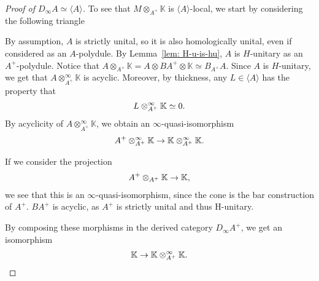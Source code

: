 \documentclass[../thesis.tex]{subfiles}
\begin{document}
\begin{proof}[Proof of $D_\infty A \simeq \langle A \rangle$]
                To see that $M \otimes_{A^+} \mathbb{K}$ is $\langle A \rangle$-local, we start by considering the following triangle
                \begin{center}
                \end{center}
                By assumption, $A$ is strictly unital, so it is also homologically unital, even if considered as an $A$-polydule. By Lemma~\ref{lem: H-u-is-hu}, $A$ is $H$-unitary as an $A^+$-polydule. Notice that $A \otimes_{A^+} \mathbb{K} = A \otimes BA^+ \otimes \mathbb{K} \simeq B_{A^+}A$. Since $A$ is $H$-unitary, we get that $A \otimes_{A^+}^\infty \mathbb{K}$ is acyclic. Moreover, by thickness, any $L\in \langle A \rangle$ has the property that
                \begin{align*}
                    L \otimes_{A^+}^\infty \mathbb{K} \simeq 0\tt{.}
                \end{align*}
                By acyclicity of $A \otimes_{A^+}^\infty \mathbb{K}$, we obtain an $\infty$-quasi-isomorphism
                \begin{align*}
                    A^+ \otimes_{A^+}^\infty \mathbb{K} \rightarrow \mathbb{K} \otimes_{A^+}^\infty \mathbb{K}\tt{.}
                \end{align*}

                If we consider the projection
                \begin{align*}
                    A^+ \otimes_{A^+}\mathbb{K} \rightarrow \mathbb{K}\tt{,}
                \end{align*}
                we see that this is an $\infty$-quasi-isomorphism, since the cone is the bar construction of $A^+$. $BA^+$ is acyclic, as $A^+$ is strictly unital and thus H-unitary.

                By composing these morphisms in the derived category $D_\infty A^+$, we get an isomorphism
                \begin{align*}
                    \mathbb{K} \rightarrow \mathbb{K} \otimes_{A^+}^\infty \mathbb{K}\tt{.}
                \end{align*}


\end{proof}
\end{document}
